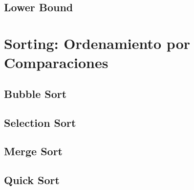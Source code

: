 \documentclass[12pt, fleqn]{report}                             %
\theoremstyle{break}                                            %
\begin{document}
        \section{Lower Bound}



    \clearpage
    \chapter{Sorting: Ordenamiento por Comparaciones}

        \section{Bubble Sort}

        \section{Selection Sort}

        \section{Merge Sort}

        \section{Quick Sort}



    \clearpage
\end{document}

